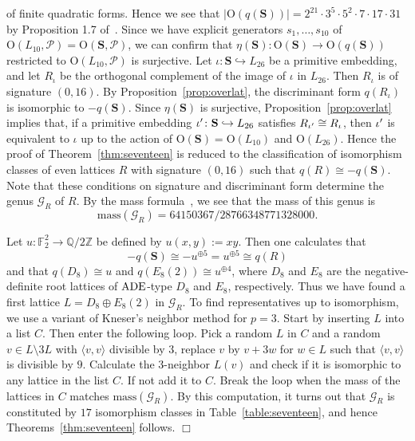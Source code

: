 \documentclass{amsart}
\newtheorem{_remark}[theorem]{\it Remark}
\newenvironment{remark}{\begin{_remark}\rm}{\end{_remark}}
\numberwithin{equation}{section}
\numberwithin{table}{section}
\numberwithin{figure}{section}
\newcommand{\F}{\mathord{\mathbb F}}
\newcommand{\Q}{\mathord{\mathbb  Q}}
\newcommand{\Z}{\mathord{\mathbb Z}}
\newcommand{\GGG}{\mathord{\mathcal G}}
\newcommand{\PPP}{\mathord{\mathcal P}}
\newcommand{\inj}{\hookrightarrow}
\newcommand{\sprime}{\sp\prime}
\newcommand{\OG}{\mathord{\mathrm{O}}}
\newcommand{\ADE}{\mathord{\rm ADE}}
\newcommand{\intf}[1]{\langle #1 \rangle}
\newcommand{\OGP}[1]{\OG(#1, \PPP)}
\newcommand{\oLtenFtwo}{{2}^{21} \cdot {3}^{5} \cdot {5}^{2} \cdot {7} \cdot {17} \cdot {31} }
\renewcommand{\SS}{\mathbf{S}}
\renewcommand{\qed}{\hfill {$\Box$}}
\begin{document}
of finite quadratic forms.
Hence we see that $|\OG(q(\SS))|=\oLtenFtwo$
 by Proposition 1.7 of~\cite{BP1983}.
Since we have explicit generators $s_1, \dots, s_{10}$ of $\OGP{L_{10}}=\OGP{\SS}$,
we can confirm that
$\eta(\SS)\colon \OG(\SS)\to \OG(q(\SS))$  restricted to $\OGP{L_{10}}$
is surjective.
%
%
Let $\iota\colon \SS\inj L_{26}$ be a primitive embedding,
and let $R_{\iota}$ be the orthogonal complement of the image of $\iota$ in $L_{26}$.
Then $R_{\iota}$ is of signature $(0, 16)$.
By Proposition~\ref{prop:overlat},
the discriminant form $q(R_{\iota})$ is isomorphic to $-q(\SS)$.
Since $\eta(\SS)$ is surjective,
Proposition~\ref{prop:overlat} implies that,
if a primitive embedding $\iota\sprime\colon \SS\inj L_{26}$
satisfies $R_{\iota\sprime}\cong R_{\iota}$, then
$\iota\sprime$ is equivalent  to $\iota$
up to the action of $\OG(\SS)=\OG(L_{10})$ and $\OG(L_{26})$.
Hence the proof of Theorem~\ref{thm:seventeen} is reduced to the classification of
isomorphism classes of even lattices $R$
with signature $(0, 16)$ such that $q(R)\cong -q(\SS)$.
Note that these conditions on signature and discriminant form
determine the genus $\GGG_R$ of $R$.
By the mass formula~\cite{CS1988},
we see that  the mass of this genus is
%
\begin{equation*}\label{eq:mass}
 \mathrm{mass}(\GGG_R)=64150367/28766348771328000.
\end{equation*}
\par
%
Let $u\colon  \F_2^2 \rightarrow \Q / 2\Z$ be defined by $u(x,y):=xy$.
Then one calculates that
\[
-q(\SS)\cong -u^{\oplus 5}=u^{\oplus 5}\cong q(R)
\]
and that $q(D_8)\cong u$ and $q(E_8(2))\cong u^{\oplus 4}$,
where $D_8$ and $E_8$ are the negative-definite root lattices of
$\ADE$-type $D_8$ and $E_8$, respectively.
Thus we have found a first lattice $L=D_8 \oplus E_8(2) $ in $\GGG_R$.
To find representatives up to isomorphism,
we use a variant of Kneser's neighbor method for $p=3$.
Start by inserting $L$ into a list $C$.
Then enter the following loop.
Pick a random $L$ in $C$ and a random $v\in L\setminus 3L$ with $\intf{v,v}$ divisible by $3$,
replace $v$ by $v +3w$ for $w \in L$ such that $\intf{v,v}$ is divisible by $9$.
Calculate the $3$-neighbor $L(v)$ and check if it is isomorphic to any lattice in the list $C$.
If not add it to $C$.
Break the loop when the mass of the lattices in $C$ matches $\mathrm{mass}(\GGG_R)$.
By this computation,
it turns out that $\GGG_R$ is constituted by $17$ isomorphism classes in Table~\ref{table:seventeen},
and hence Theorems~\ref{thm:seventeen} follows.
\qed
%
%
\end{document}

